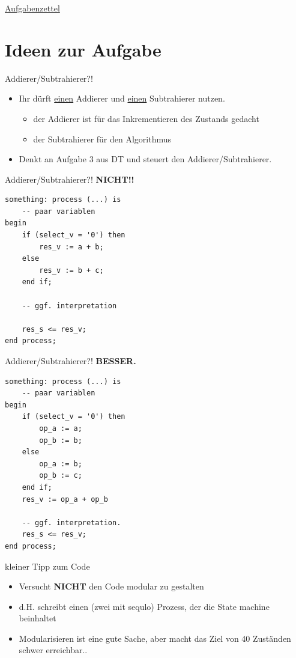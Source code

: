 \documentclass[aspectratio=169,presentation]{beamer}
\newcommand{\sectionframe}[1]{
	\begin{frame}
		\vfill
		\Huge
		\centering
		\usebeamercolor[fg]{title}
		#1
		\vfill
		\par
	\end{frame}
}
\begin{document}
\sectionframe{\href{http://users.informatik.haw-hamburg.de/~schafers/LOCAL/S19S_CE/Aufgabenzettel_Nr2_v08.pdf}{Aufgabenzettel}}


\section{Ideen zur Aufgabe}
\begin{frame} {Addierer/Subtrahierer?!}
	\begin{itemize}
		\item Ihr dürft \underline{einen} Addierer und \underline{einen} Subtrahierer nutzen.
		\begin{itemize}
			\item der Addierer ist für das Inkrementieren des Zustands gedacht
			\item der Subtrahierer für den Algorithmus
		\end{itemize}
		\item Denkt an Aufgabe 3 aus DT und steuert den Addierer/Subtrahierer.		      
	\end{itemize}
\end{frame}


\begin{frame} [fragile] {Addierer/Subtrahierer?!}
\textbf{NICHT!!}
	\begin{lstlisting}
something: process (...) is 
	-- paar variablen
begin
	if (select_v = '0') then
		res_v := a + b;
	else
		res_v := b + c;
	end if;
	
	-- ggf. interpretation

	res_s <= res_v;
end process;
	\end{lstlisting}
\end{frame}


\begin{frame} [fragile] {Addierer/Subtrahierer?!}
\textbf{BESSER.}
	\begin{lstlisting}
something: process (...) is 
	-- paar variablen
begin
	if (select_v = '0') then
		op_a := a;
		op_b := b;
	else
		op_a := b;
		op_b := c;
	end if;
	res_v := op_a + op_b

	-- ggf. interpretation. 
	res_s <= res_v;
end process;
	\end{lstlisting}
\end{frame}


\begin{frame} {kleiner Tipp zum Code}
	\begin{itemize}
		\item Versucht \textbf{NICHT} den Code modular zu gestalten
		\item d.H. schreibt einen (zwei mit sequlo) Prozess, der die State machine beinhaltet
		\item Modularisieren ist eine gute Sache, aber macht das Ziel von 40 Zuständen schwer erreichbar..
	\end{itemize}
\end{frame}
\end{document}
